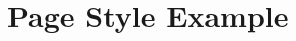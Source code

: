 \documentclass{article}
\begin{document}
\section{Page Style Example}
\lipsum[1-10] %
\end{document}
